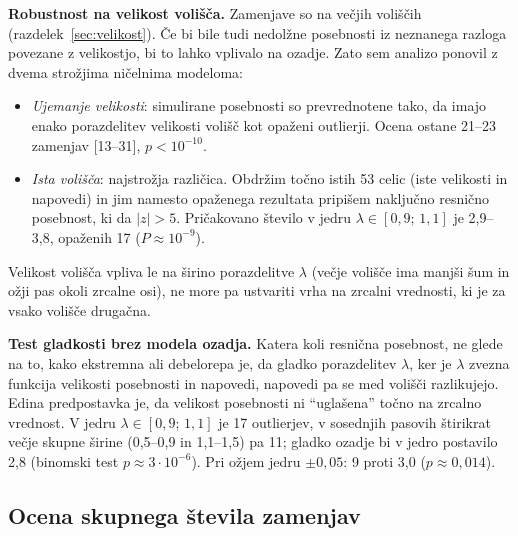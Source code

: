 \documentclass[11pt,a4paper]{article}
\begin{document}
\textbf{Robustnost na velikost volišča.} Zamenjave so na večjih voliščih (razdelek~\ref{sec:velikost}). Če bi bile tudi nedolžne posebnosti iz neznanega razloga povezane z velikostjo, bi to lahko vplivalo na ozadje. Zato sem analizo ponovil z dvema strožjima ničelnima modeloma:
\begin{itemize}
\item \emph{Ujemanje velikosti}: simulirane posebnosti so prevrednotene tako, da imajo enako porazdelitev velikosti volišč kot opaženi outlierji. Ocena ostane 21--23 zamenjav [13--31], $p<10^{-10}$.
\item \emph{Ista volišča}: najstrožja različica. Obdržim točno istih 53 celic (iste velikosti in napovedi) in jim namesto opaženega rezultata pripišem naključno resnično posebnost, ki da $|z|>5$. Pričakovano število v jedru $\lambda\in[0{,}9;\,1{,}1]$ je 2,9--3,8, opaženih 17 ($P\approx10^{-9}$).
\end{itemize}
Velikost volišča vpliva le na širino porazdelitve $\lambda$ (večje volišče ima manjši šum in ožji pas okoli zrcalne osi), ne more pa ustvariti vrha na zrcalni vrednosti, ki je za vsako volišče drugačna.

\textbf{Test gladkosti brez modela ozadja.} Katera koli resnična posebnost, ne glede na to, kako ekstremna ali debelorepa je, da gladko porazdelitev $\lambda$, ker je $\lambda$ zvezna funkcija velikosti posebnosti in napovedi, napovedi pa se med volišči razlikujejo. Edina predpostavka je, da velikost posebnosti ni ``uglašena'' točno na zrcalno vrednost. V jedru $\lambda\in[0{,}9;\,1{,}1]$ je 17 outlierjev, v sosednjih pasovih štirikrat večje skupne širine (0,5--0,9 in 1,1--1,5) pa 11; gladko ozadje bi v jedro postavilo 2,8 (binomski test $p\approx3\cdot10^{-6}$). Pri ožjem jedru $\pm0{,}05$: 9 proti 3,0 ($p\approx0{,}014$).

\subsection{Ocena skupnega števila zamenjav}\label{sec:skupno}
\end{document}
